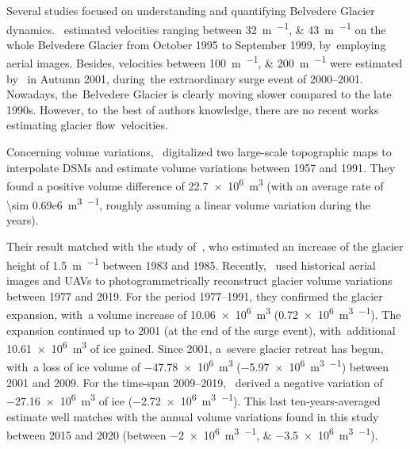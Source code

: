 Several studies focused on understanding and quantifying Belvedere Glacier
dynamics.~\cite{Kaab2005} estimated velocities ranging between
\SIlist{32;43}{\meter\per\year} on the whole Belvedere Glacier from October 1995 to
September 1999, by~employing aerial images.
Besides, velocities between \SIlist{100;200}{\meter\per\year} were estimated
by~\cite{Kaab2005} in Autumn 2001, during~the extraordinary surge event of 2000--2001.
Nowadays, the~Belvedere Glacier is clearly moving slower compared to the late 1990s.
However, to~the best of authors knowledge, there are no recent works estimating glacier
flow~velocities.

Concerning volume variations,~\cite{Diolaiuti2003} digitalized two large-scale
topographic maps to interpolate DSMs and estimate volume variations between 1957 and
1991.
They found a positive volume difference of
\SI[retain-explicit-plus]{+22.7e6}{\cubic\meter} (with an average rate of \SI{\sim
    0.69e6}{\cubic\m\per\year}, roughly assuming a linear volume variation during the
years).

Their result matched with the study of~\cite{Roethlisberger1985}, who estimated an
increase of the glacier height of \SI[retain-explicit-plus]{+1.5}{\m\per\year} between
1983 and 1985.
Recently,~\cite{Degaetani2021} used historical aerial images and UAVs to
photogrammetrically reconstruct glacier volume variations between 1977 and 2019.
For the period \mbox{1977--1991}, they confirmed the glacier expansion, with~a volume
increase of \SI[retain-explicit-plus]{+10.06e6}{\cubic\meter}
(\SI[retain-explicit-plus]{+0.72e6}{\cubic\m\per\year}).
The expansion continued up to 2001 (at the end of the surge event), with~additional
\SI{10.61e6}{\cubic\m} of ice gained.
Since 2001, a~severe glacier retreat has begun, with~a loss of ice volume of
\SI{-47.78e6}{\cubic\meter} (\SI{-5.97e6}{\cubic\meter\per\year}) between 2001 and 2009.
For the time-span 2009--2019,~\cite{Degaetani2021} derived a negative variation of
\SI{-27.16e6}{\cubic\m} of ice (\SI{-2.72e6}{\cubic\meter\per\year}).
This last ten-years-averaged estimate well matches with the annual volume variations
found in this study between 2015 and 2020 (between
\SIlist{-2e6;-3.5e6}{\cubic\meter\per\year}).



